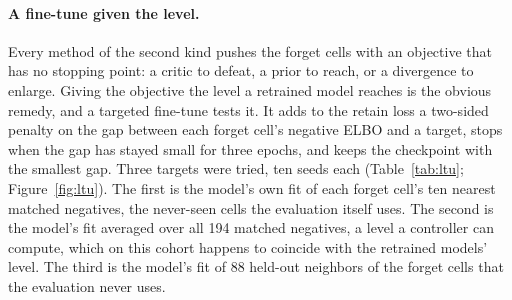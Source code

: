 \documentclass{article}
\begin{document}
\begin{table}[t]
\centering
\caption{Gradient ascent with a larger ascent step and Fisher scrubbing with a step cap between the default and the first ablation, three seeds each on PBMC-33k cluster 13. The audit uses the mean of the five clean retrains as the reference, and the column beside it, labeled in range, counts, of the three seeds, those whose audit lies inside the range spanned by every ordered pair of the five clean retrains (0.17 to 0.83, Table~\ref{tab:reference}). The forget median is the per-cell negative ELBO's median over the forget cells. The attacker is the canonical instance of Table~\ref{tab:main}, with the advantage $2|\mathrm{AUC}-0.5|$ and the paired difference from the retrained models with its verdict at the margin of \protect. The baseline row, the positive control, is one model labeled trained on the cells, and the retrained row is the five clean retrains. Held-out ELBO and marker $r$ come from \texttt{utility\_intervals.json}, the source of Table~\ref{tab:main}. Generated from \texttt{sweep\_scores.json}, \texttt{paired\_diff\_33k.json}, and \texttt{utility\_intervals.json}.}
\label{tab:sweeps}
\small
\resizebox{\textwidth}{!}{}
\end{table}

\paragraph{A fine-tune given the level.} Every method of the second kind pushes the forget cells with an objective that has no stopping point: a critic to defeat, a prior to reach, or a divergence to enlarge. Giving the objective the level a retrained model reaches is the obvious remedy, and a targeted fine-tune tests it. It adds to the retain loss a two-sided penalty on the gap between each forget cell's negative ELBO and a target, stops when the gap has stayed small for three epochs, and keeps the checkpoint with the smallest gap. Three targets were tried, ten seeds each (Table~\ref{tab:ltu}; Figure~\ref{fig:ltu}). The first is the model's own fit of each forget cell's ten nearest matched negatives, the never-seen cells the evaluation itself uses. The second is the model's fit averaged over all 194 matched negatives, a level a controller can compute, which on this cohort happens to coincide with the retrained models' level. The third is the model's fit of 88 held-out neighbors of the forget cells that the evaluation never uses.
\end{document}

